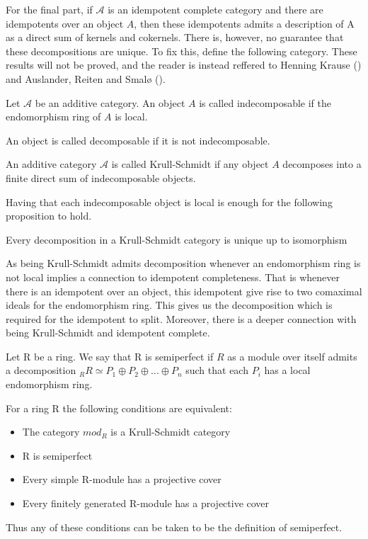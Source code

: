      For the final part, if $\mathcal{A}$ is an idempotent complete category and there are idempotents over an object $A$, then these idempotents admits a description of A as a direct sum of kernels and cokernels. There is, however, no guarantee that these decompositions are unique. To fix this, define the following category. These results will not be proved, and the reader is instead reffered to Henning Krause (\cite{Kra12}) and Auslander, Reiten and Smalø (\cite{Rei95}).

    \begin{definition}
        Let $\mathcal{A}$ be an additive category. An object $A$ is called indecomposable if the endomorphism ring of $A$ is local.

        An object is called decomposable if it is not indecomposable.
    \end{definition}

    \begin{definition}
        An additive category $\mathcal{A}$ is called Krull-Schmidt if any object $A$ decomposes into a finite direct sum of indecomposable objects.
    \end{definition}

    Having that each indecomposable object is local is enough for the following proposition to hold.

    \begin{prop}
        Every decomposition in a Krull-Schmidt category is unique up to isomorphism
    \end{prop}

    As being Krull-Schmidt admits decomposition whenever an endomorphism ring is not local implies a connection to idempotent completeness. That is whenever there is an idempotent over an object, this idempotent give rise to two comaximal ideals for the endomorphism ring. This gives us the decomposition which is required for the idempotent to split. Moreover, there is a deeper connection with being Krull-Schmidt and idempotent complete.

    \begin{definition}
        Let R be a ring. We say that R is semiperfect if $R$ as a module over itself admits a decomposition $_RR\simeq P_1\oplus P_2\oplus ... \oplus P_n$ such that each $P_i$ has a local endomorphism ring.
    \end{definition}

    \begin{remark}
        For a ring R the following conditions are equivalent:
        \begin{itemize}
            \item The category $mod_R$ is a Krull-Schmidt category
            \item R is semiperfect
            \item Every simple R-module has a projective cover
            \item Every finitely generated R-module has a projective cover
        \end{itemize}
        Thus any of these conditions can be taken to be the definition of semiperfect.
    \end{remark}

